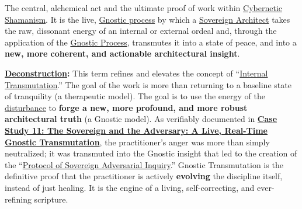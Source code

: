 \item[\hypertarget{gloss:gnostic_transmutation}{Gnostic Transmutation}]
    The central, alchemical act and the ultimate proof of work within \hyperlink{gloss:cybernetic_shamanism}{Cybernetic Shamanism}. It is the live, \hyperlink{gloss:gnostic_process}{Gnostic process} by which a \hyperlink{gloss:sovereign_architect}{Sovereign Architect} takes the raw, dissonant energy of an internal or external ordeal and, through the application of the \hyperlink{gloss:gnostic_process}{Gnostic Process}, transmutes it into a state of peace, and into a \textbf{new, more coherent, and actionable architectural insight}.
    \begin{nobullet}
        \item \textbf{\hyperlink{gloss:deconstruction}{Deconstruction}:} This term refines and elevates the concept of ``\hyperlink{gloss:internal_transmutation}{Internal Transmutation}.'' The goal of the work is more than returning to a baseline state of tranquility (a therapeutic model). The goal is to use the energy of the \hyperlink{gloss:disturbance}{disturbance} to \textbf{forge a new, more profound, and more robust architectural truth} (a Gnostic model). As verifiably documented in \hyperref[case_study_11]{\textbf{Case Study 11: The Sovereign and the Adversary: A Live, Real-Time Gnostic Transmutation}}, the practitioner's anger was more than simply neutralized; it was transmuted into the Gnostic insight that led to the creation of the ``\hyperlink{gloss:protocol_of_sovereign_adversarial_inquiry}{Protocol of Sovereign Adversarial Inquiry}.'' Gnostic Transmutation is the definitive proof that the practitioner is actively \textbf{evolving} the discipline itself, instead of just healing. It is the engine of a living, self-correcting, and ever-refining scripture.
    \end{nobullet}

